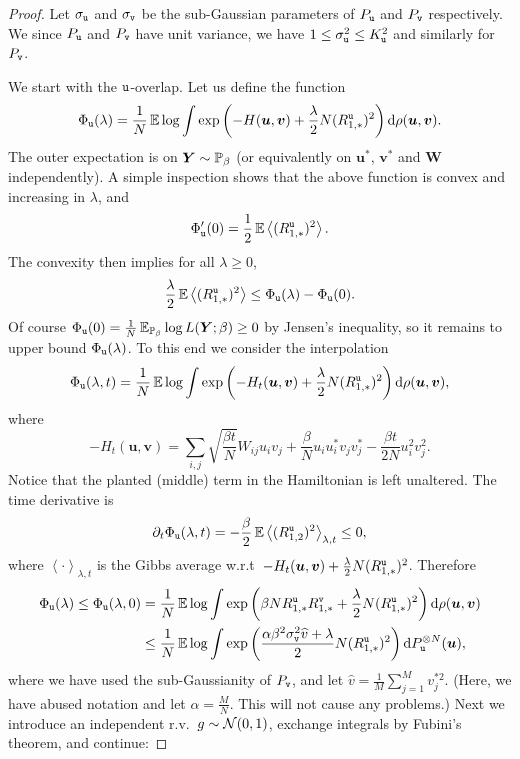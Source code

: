\documentclass[final,12pt]{colt2018} %
\newcommand{\utt}{\textup{\texttt{u}}}
\newcommand{\vtt}{\textup{\texttt{v}}}
\renewcommand{\u}{\bm{u}}
\renewcommand{\v}{\bm{v}}
\newcommand{\Y}{\bm{Y}}
\newcommand{\W}{\bm{W}}
\begin{document}
\begin{proof}
Let $\sigma_{\utt}$ and $\sigma_{\vtt}$ be the sub-Gaussian parameters of $P_{\utt}$ and $P_{\vtt}$ respectively. We since $P_{\utt}$ and $P_{\vtt}$ have unit variance, we have $1 \le \sigma_{\utt}^2 \le K_{\utt}^2$ and similarly for $P_{\vtt}$.

We start with the $\utt$-overlap. Let us define the function
\[\Phi_{\utt}(\lambda) = \frac{1}{N}\E \log \int \exp\left(-H(\u,\v) + \frac{\lambda}{2} N (R_{1,*}^{\utt})^2\right) \rmd \rho(\u,\v).\]
The outer expectation is on $\Y \sim \P_{\beta}$ (or equivalently on $\u^*$, $\v^*$ and $\W$ independently). 
A simple inspection shows that the above function is convex and increasing in $\lambda$, and
\[\Phi_{\utt}'(0) = \half\E\left \langle (R^{\utt}_{1,*})^2\right \rangle.\] 
The convexity then implies for all $\lambda \ge 0$,
\[\frac{\lambda}{2}\E\left \langle (R^{\utt}_{1,*})^2\right \rangle \le \Phi_{\utt}(\lambda) - \Phi_{\utt}(0). \]
Of course $\Phi_{\utt}(0) = \frac{1}{N}\E_{\P_{\beta}} \log L(\Y;\beta) \ge 0$ by Jensen's inequality, so it remains to upper bound $\Phi_{\utt}(\lambda)$.
To this end we consider the interpolation
\[\Phi_{\utt}(\lambda,t) = \frac{1}{N}\E \log \int \exp\left(-H_t(\u,\v) + \frac{\lambda}{2} N (R_{1,*}^{\utt})^2\right) \rmd \rho(\u,\v),\]
where 
\[-H_t(\u,\v) = \sum_{i,j}\sqrt{\frac{\beta t}{N}}W_{ij}u_iv_j + \frac{\beta}{N}u_iu_i^*v_jv_j^*- \frac{\beta t}{2N} u_i^2v_j^2.\]
Notice that the planted (middle) term in the Hamiltonian is left unaltered. The time derivative is
\[\partial_t \Phi_{\utt}(\lambda,t) = -\frac{\beta}{2}\E\left \langle (R^{\utt}_{1,2})^2\right\rangle_{\lambda,t} \le 0,\]
where $\left \langle \cdot \right\rangle_{\lambda,t}$ is the Gibbs average w.r.t\ $-H_t(\u,\v) + \frac{\lambda}{2} N (R_{1,*}^{\utt})^2$. Therefore
\begin{align*}
\Phi_{\utt}(\lambda) \le \Phi_{\utt}(\lambda,0) &= \frac{1}{N}\E \log \int \exp\left(\beta N R_{1,*}^{\utt}R_{1,*}^{\vtt} + \frac{\lambda}{2} N (R_{1,*}^{\utt})^2\right) \rmd \rho(\u,\v)\\
&\le \frac{1}{N}\E \log \int \exp\left(\frac{\alpha\beta^2\sigma_\vtt^2 \widehat{v}  + \lambda}{2} N (R_{1,*}^{\utt})^2\right) \rmd P_{\utt}^{\otimes N}(\u),
\end{align*}
where we have used the sub-Gaussianity of $P_{\vtt}$, and let $\widehat{v} = \frac{1}{M}\sum_{j=1}^Mv_j^{*2}$. (Here, we have abused notation and let $\alpha = \frac{M}{N}$. This will not cause any problems.) 
Next we introduce an independent r.v.\ $g \sim \mathcal{N}(0,1)$, exchange integrals by Fubini's theorem, and continue:

\end{proof}
\end{document}
